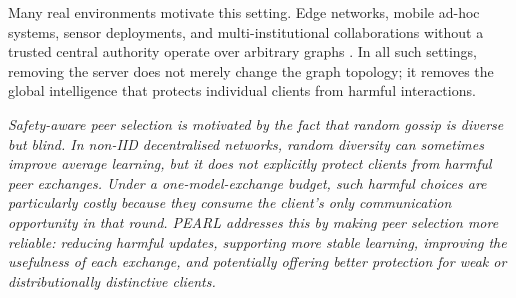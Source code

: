 \documentclass[conference]{IEEEtran}
\begin{document}
Many real environments motivate this setting. Edge networks, mobile ad-hoc systems, sensor deployments, and multi-institutional collaborations without a trusted central authority operate over arbitrary graphs \cite{yuan2023decentralized}. In all such settings, removing the server does not merely change the graph topology; it removes the global intelligence that protects individual clients from harmful interactions.

\textit{Safety-aware peer selection is motivated by the fact that random gossip is diverse but blind. In non-IID decentralised networks, random diversity can sometimes improve average learning, but it does not explicitly protect clients from harmful peer exchanges. Under a one-model-exchange budget, such harmful choices are particularly costly because they consume the client’s only communication opportunity in that round. PEARL addresses this by making peer selection more reliable: reducing harmful updates, supporting more stable learning, improving the usefulness of each exchange, and potentially offering better protection for weak or distributionally distinctive clients.}
\end{document}
